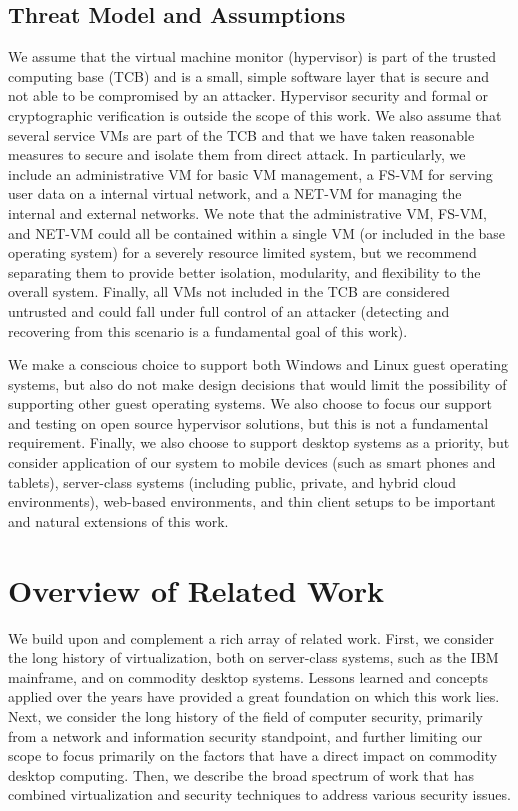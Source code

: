 \subsection{Threat Model and Assumptions}

We assume that the virtual machine monitor (hypervisor) is part of the trusted computing base (TCB) and is a small, simple software layer that is secure and not able to be compromised by an attacker. Hypervisor security and formal or cryptographic verification is outside the scope of this work. We also assume that several service VMs are part of the TCB and that we have taken reasonable measures to secure and isolate them from direct attack. In particularly, we include an administrative VM for basic VM management, a FS-VM for serving user data on a internal virtual network, and a NET-VM for managing the internal and external networks. We note that the administrative VM, FS-VM, and NET-VM could all be contained within a single VM (or included in the base operating system) for a severely resource limited system, but we recommend separating them to provide better isolation, modularity, and flexibility to the overall system. Finally, all VMs not included in the TCB are considered untrusted and could fall under full control of an attacker (detecting and recovering from this scenario is a fundamental goal of this work).

We make a conscious choice to support both Windows and Linux guest operating systems, but also do not make design decisions that would limit the possibility of supporting other guest operating systems.  We also choose to focus our support and testing on open source hypervisor solutions, but this is not a fundamental requirement. Finally, we also choose to support desktop systems as a priority, but consider application of our system to mobile devices (such as smart phones and tablets), server-class systems (including public, private, and hybrid cloud environments), web-based environments, and thin client setups to be important and natural extensions of this work.

\section{Overview of Related Work}
\label{sec:related}

We build upon and complement a rich array of related work. First, we consider the long history of virtualization, both on server-class systems, such as the IBM mainframe, and on commodity desktop systems. Lessons learned and concepts applied over the years have provided a great foundation on which this work lies. Next, we consider the long history of the field of computer security, primarily from a network and information security standpoint, and further limiting our scope to focus primarily on the factors that have a direct impact on commodity desktop computing. Then, we describe the broad spectrum of work that has combined virtualization and security techniques to address various security issues.

